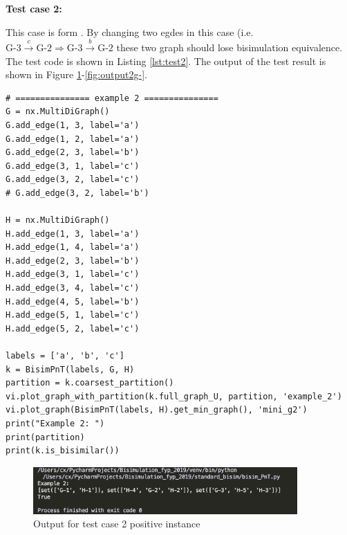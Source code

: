 \vspace{+0.2em}
\noindent\textbf{Test case 2:}

\noindent This case is form \cite{Stirling2011a}.
By changing two egdes in this case (i.e. $\text{G-3}\stackrel{c}{\rightarrow}\text{G-2} \Longrightarrow \text{G-3}\stackrel{b}{\rightarrow}\text{G-2}$ these two graph should lose bisimulation equivalence.
The test code is shown in Listing \ref{lst:test2}.
The output of the test result is shown in Figure \ref{fig:output2}-\ref{fig:output2g-}.
\begin{code}
\caption{Test code for case 2}
\label{lst:test2}
\begin{verbatim}
# =============== example 2 ===============
G = nx.MultiDiGraph()
G.add_edge(1, 3, label='a')
G.add_edge(1, 2, label='a')
G.add_edge(2, 3, label='b')
G.add_edge(3, 1, label='c')
G.add_edge(3, 2, label='c')
# G.add_edge(3, 2, label='b')

H = nx.MultiDiGraph()
H.add_edge(1, 3, label='a')
H.add_edge(1, 4, label='a')
H.add_edge(2, 3, label='b')
H.add_edge(3, 1, label='c')
H.add_edge(3, 4, label='c')
H.add_edge(4, 5, label='b')
H.add_edge(5, 1, label='c')
H.add_edge(5, 2, label='c')

labels = ['a', 'b', 'c']
k = BisimPnT(labels, G, H)
partition = k.coarsest_partition()
vi.plot_graph_with_partition(k.full_graph_U, partition, 'example_2')
vi.plot_graph(BisimPnT(labels, H).get_min_graph(), 'mini_g2')
print("Example 2: ")
print(partition)
print(k.is_bisimilar())
\end{verbatim}
\end{code}

\begin{figure}[H]
\centering
\includegraphics[width=0.9\textwidth]{img/output2.png}
\caption{Output for test case 2 positive instance}
\label{fig:output2}
\end{figure}


